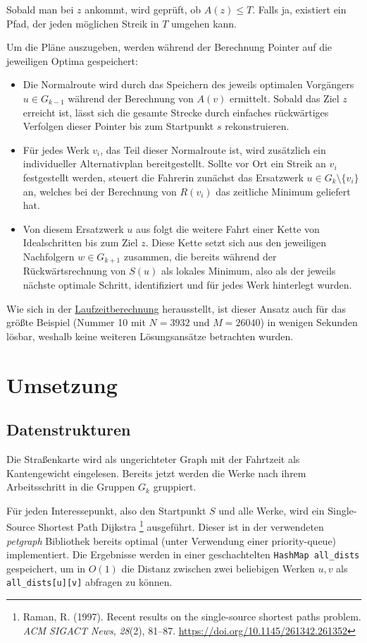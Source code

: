 \documentclass[a4paper,10pt,ngerman]{scrartcl}
\begin{document}
    Sobald man bei $z$ ankommt, wird geprüft, ob $A(z) \leq T$. Falls ja, existiert ein Pfad, der jeden möglichen Streik
    in $T$ umgehen kann.

    Um die Pläne auszugeben, werden während der Berechnung Pointer auf die jeweiligen Optima gespeichert:
    \begin{itemize}
        \item Die Normalroute wird durch das Speichern des jeweils optimalen Vorgängers $u \in G_{k-1}$ während der Berechnung von $A(v)$ ermittelt. Sobald das Ziel $z$ erreicht ist, lässt sich die gesamte Strecke durch einfaches rückwärtiges Verfolgen dieser Pointer bis zum Startpunkt $s$ rekonstruieren.
        \item Für jedes Werk $v_i$, das Teil dieser Normalroute ist, wird zusätzlich ein individueller Alternativplan bereitgestellt. Sollte vor Ort ein Streik an $v_i$ festgestellt werden, steuert die Fahrerin zunächst das Ersatzwerk $u \in G_k \setminus \{v_i\}$ an, welches bei der Berechnung von $R(v_i)$ das zeitliche Minimum geliefert hat.
        \item Von diesem Ersatzwerk $u$ aus folgt die weitere Fahrt einer Kette von Idealschritten bis zum Ziel $z$. Diese Kette setzt sich aus den jeweiligen Nachfolgern $w \in G_{k+1}$ zusammen, die bereits während der Rückwärtsrechnung von $S(u)$ als lokales Minimum, also als der jeweils nächste optimale Schritt, identifiziert und für jedes Werk hinterlegt wurden.
    \end{itemize}

    Wie sich in der \hyperref[sec:laufzeit]{Laufzeitberechnung} herausstellt, ist dieser Ansatz auch für das größte
    Beispiel (Nummer 10 mit $N = 3932$ und $M = 26040$) in wenigen Sekunden lösbar, weshalb keine weiteren
    Lösungsansätze betrachten wurden.

    \section{Umsetzung}
    \subsection{Datenstrukturen}
    Die Straßenkarte wird als ungerichteter Graph mit der Fahrtzeit als Kantengewicht eingelesen.
    Bereits jetzt werden die Werke nach ihrem Arbeitsschritt in die Gruppen $G_k$ gruppiert.

    Für jeden Interessepunkt, also den Startpunkt $S$ und alle Werke, wird ein Single-Source Shortest Path Dijkstra
    \footnote{Raman, R. (1997). Recent results on the single-source shortest paths problem.
    \textit{ACM SIGACT News}, \textit{28}(2), 81–87. \url{https://doi.org/10.1145/261342.261352}}
    ausgeführt. Dieser ist in der verwendeten \textit{petgraph} Bibliothek bereits optimal (unter Verwendung einer
    priority-queue) implementiert. Die Ergebnisse werden in einer geschachtelten \texttt{HashMap all\_dists} gespeichert,
    um in $O(1)$ die Distanz zwischen zwei beliebigen Werken $u, v$ als \texttt{all\_dists[u][v]} abfragen zu können.
\end{document}
